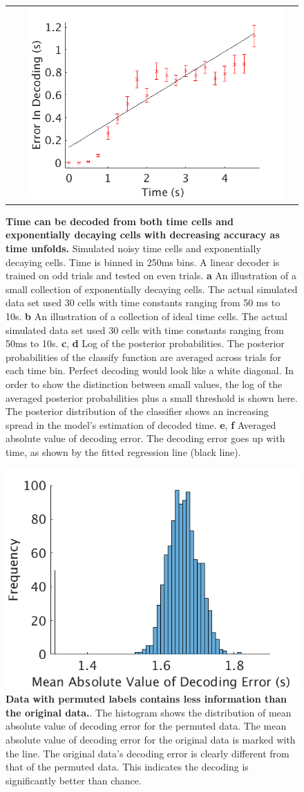 \documentclass{apa}
\begin{document}
\begin{figure}
\begin{tabular}[t]{l c l c}
 & &
\includegraphics[width=.4\linewidth]{figs/AbsErrorTimeCells_20noiseV3.png}
\end{tabular}
\caption{\textbf{Time can be decoded from both time cells and exponentially
decaying cells with decreasing accuracy as time unfolds.} Simulated noisy
time cells and exponentially decaying cells.  Time is binned in 250ms bins.  A
linear decoder is trained on odd trials and tested on even trials.  \textbf{a}
An illustration of a small collection of exponentially decaying cells.  The
actual simulated data set used 30 cells with time constants ranging from 50 ms
to 10s. \textbf{b} An illustration of a collection of ideal time cells.  The
actual simulated data set used 30 cells with time constants ranging from 50ms
to 10s.  \textbf{c}, \textbf{d} Log of the posterior probabilities.  The
posterior probabilities of the classify function are averaged across trials
for each time bin.  Perfect decoding would look like a white diagonal.  In
order to show the distinction between small values, the log of the averaged
posterior probabilities plus a small threshold is shown here.  The posterior
distribution of the classifier shows an increasing spread in the model's
estimation of decoded time. \textbf{e}, \textbf{f} Averaged absolute value of
decoding error.  The decoding error goes up with time, as shown by the fitted
regression line (black line). }
\label{fig:LDA_simulated} 
\end{figure}

\begin{figure}
\includegraphics[width=.7\linewidth]{figs/Permutest_V2.png}
\caption{\textbf{Data with permuted labels contains less information than the original data.}. 
The histogram shows the distribution of mean absolute value of decoding error for the permuted data.  
The mean absolute value of decoding error for the original data is marked with the line.  
The original data's decoding error is clearly different from that of the permuted data.  This indicates the decoding is significantly better than chance.}
\label{fig:permutest}
\end{figure}
\end{document}
